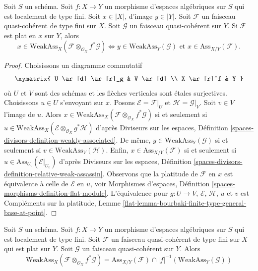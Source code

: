 \begin{lemma}
\label{lemma-bourbaki-finite-type-general-base-at-point}
Soit $S$ un schéma.
Soit $f : X \to Y$ un morphisme d'espaces algébriques sur $S$ qui est
localement de type fini. Soit $x \in |X|$, d'image $y \in |Y|$.
Soit $\mathcal{F}$ un faisceau quasi-cohérent de type fini sur $X$.
Soit $\mathcal{G}$ un faisceau quasi-cohérent sur $Y$.
Si $\mathcal{F}$ est plat en $x$ sur $Y$, alors
$$
x \in \text{WeakAss}_X(\mathcal{F} \otimes_{\mathcal{O}_X} f^*\mathcal{G})
\Leftrightarrow
y \in \text{WeakAss}_Y(\mathcal{G})
\text{ et }
x \in \text{Ass}_{X/Y}(\mathcal{F}).
$$
\end{lemma}

\begin{proof}
Choisissons un diagramme commutatif
$$
\xymatrix{
U \ar[d] \ar[r]_g & V \ar[d] \\
X \ar[r]^f & Y
}
$$
où $U$ et $V$ sont des schémas et les flèches verticales sont \'etales surjectives.
Choisissons $u \in U$ s'envoyant sur $x$. Posons $\mathcal{E} = \mathcal{F}|_U$
et $\mathcal{H} = \mathcal{G}|_V$.
Soit $v \in V$ l'image de $u$. Alors
$x \in \text{WeakAss}_X(\mathcal{F} \otimes_{\mathcal{O}_X} f^*\mathcal{G})$
si et seulement si
$u \in \text{WeakAss}_X(\mathcal{E} \otimes_{\mathcal{O}_X} g^*\mathcal{H})$
d'après Diviseurs sur les espaces, Définition
\ref{spaces-divisors-definition-weakly-associated}.
De même, $y \in \text{WeakAss}_Y(\mathcal{G})$ si et seulement si
$v \in \text{WeakAss}_V(\mathcal{H})$.
Enfin, $x \in \text{Ass}_{X/Y}(\mathcal{F})$ si et seulement si
$u \in \text{Ass}_{U_v}(\mathcal{E}|_{U_v})$ d'après
Diviseurs sur les espaces, Définition
\ref{spaces-divisors-definition-relative-weak-assassin}.
Observons que la platitude de $\mathcal{F}$ en $x$ est
équivalente à celle de $\mathcal{E}$ en $u$, voir
Morphismes d'espaces, Définition \ref{spaces-morphisms-definition-flat-module}.
L'équivalence pour $g : U \to V$, $\mathcal{E}$, $\mathcal{H}$, $u$ et $v$
est Compléments sur la platitude, Lemme
\ref{flat-lemma-bourbaki-finite-type-general-base-at-point}.
\end{proof}

\begin{lemma}
\label{lemma-bourbaki-finite-type-general-base}
Soit $S$ un schéma. Soit $f : X \to Y$ un morphisme d'espaces algébriques
sur $S$ qui est localement de type fini.
Soit $\mathcal{F}$ un faisceau quasi-cohérent de type fini sur $X$
qui est plat sur $Y$. Soit $\mathcal{G}$ un faisceau quasi-cohérent sur $Y$.
Alors
$$
\text{WeakAss}_X(\mathcal{F} \otimes_{\mathcal{O}_X} f^*\mathcal{G}) =
\text{Ass}_{X/Y}(\mathcal{F}) \cap
|f|^{-1}(\text{WeakAss}_Y(\mathcal{G}))
$$
\end{lemma}

